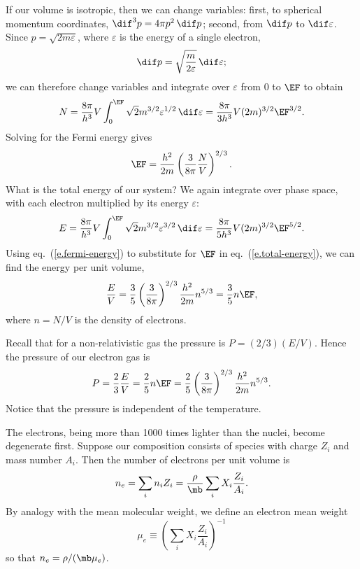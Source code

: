 If our volume is isotropic, then we can change variables: first, to spherical momentum coordinates, $\dif^{3}p = 4\pi p^{2}\,\dif p$; second, from $\dif p$ to $\dif\varepsilon$.  Since $p = \sqrt{2m\varepsilon}$, where $\varepsilon$ is the energy of a single electron,
\[
	\dif p = \sqrt{\frac{m}{2\varepsilon}}\,\dif \varepsilon;
\]
we can therefore change variables and integrate over $\varepsilon$ from $0$ to $\EF$ to obtain
\[
	N = \frac{8\pi}{h^{3}}V \int_{0}^{\EF} \sqrt{2}m^{3/2}\varepsilon^{1/2}\,\dif \varepsilon
	= \frac{8\pi}{3h^{3}} V (2m)^{3/2} \EF^{3/2}.
\]
Solving for the Fermi energy gives
\begin{equation}\label{e.fermi-energy}
	\EF = \frac{h^{2}}{2m}\left(\frac{3}{8\pi}\frac{N}{V}\right)^{2/3}.
\end{equation}
What is the total energy of our system? We again integrate over phase space, with each electron multiplied by its energy $\varepsilon$:
\begin{equation}\label{e.total-energy}
	E = \frac{8\pi}{h^{3}}V\int_{0}^{\EF}\sqrt{2}m^{3/2}\varepsilon^{3/2}\,\dif\varepsilon = \frac{8\pi}{5h^{3}}V(2m)^{3/2} \EF^{5/2}.
\end{equation}
Using eq.~(\ref{e.fermi-energy}) to substitute for $\EF$ in eq.~(\ref{e.total-energy}), we can find the energy per unit volume,
\[
	\frac{E}{V} = \frac{3}{5}\left(\frac{3}{8\pi}\right)^{2/3}\frac{h^{2}}{2m}n^{5/3} = \frac{3}{5} n \EF,
\]
where $n=N/V$ is the density of electrons.

Recall that for a non-relativistic gas the pressure is $P = (2/3)(E/V)$.  Hence the pressure of our electron gas is
\begin{equation}\label{e.pressure-electrons}
	P = \frac{2}{3}\frac{E}{V} = \frac{2}{5} n\EF
		= \frac{2}{5}\left(\frac{3}{8\pi}\right)^{2/3}\frac{h^{2}}{2m}n^{5/3}.
\end{equation}
Notice that the pressure is independent of the temperature.

The electrons, being more than 1000 times lighter than the nuclei, become degenerate first. Suppose our composition consists of species with charge $Z_{i}$ and mass number $A_{i}$. Then the number of electrons per unit volume is
\[
	n_{e} = \sum_{i} n_{i} Z_{i} = \frac{\rho}{\mb}\sum_{i} X_{i}\frac{Z_{i}}{A_{i}}.
\]
By analogy with the mean molecular weight, we define an electron mean weight
\begin{equation}\label{e.electron-mean-weight}
\mu_{e} \equiv \left(\sum_{i}X_{i}\frac{Z_{i}}{A_{i}}\right)^{-1}
\end{equation}
so that $n_{e} = \rho/(\mb\mu_{e})$.

